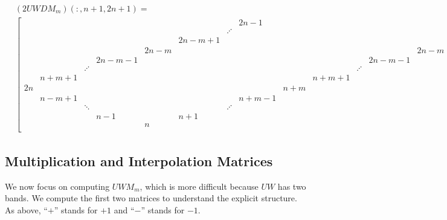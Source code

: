 \begin{sidewaysfigure}
\begin{align}
    &(2UWDM_{m})(:,n+1,2n+1) = \nonumber\\
    &\begin{bmatrix}
        &     &   &      &    &      &       &2n-1 &   &     &   &      & \\
        &     &   &      &    &      &\iddots&     &   &     &   &      & \\
        &     &   &      &    &2n-m+1&       &     &   &     &   &      & \\
        &     &   &      &2n-m&      &       &     &   &     &   &      &2n-m\\
        &     &   &2n-m-1&    &      &       &     &   &     &   &2n-m-1&   \\
        & &\iddots&      &    &      &       &     &   & &\iddots&      &   \\
        &n+m+1&   &      &    &      &       &     &   &n+m+1&   &      &   \\
      2n&     &   &      &    &      &       &     &n+m&     &   &      &   \\
        &n-m+1&   &      &    &      &       &n+m-1&   &     &   &      &   \\
        & &\ddots &      &    &      &\iddots&     &   &     &   &      &   \\
        &     &   & n-1  &    & n+1  &       &     &   &     &   &      &   \\
        &     &   &      &  n &      &       &     &   &     &   &      &   \\
    \end{bmatrix}
    \label{eq:cvp_UWDMm_2}
\end{align}
\end{sidewaysfigure}



\subsection{Multiplication and Interpolation \CV{} Matrices}

We now focus on computing $UWM_{m}$, which is more difficult because
$UW$ has two bands.
We compute the first two matrices to understand the explicit structure.
As above, ``$+$'' stands for $+1$ and ``$-$'' stands for $-1$.

